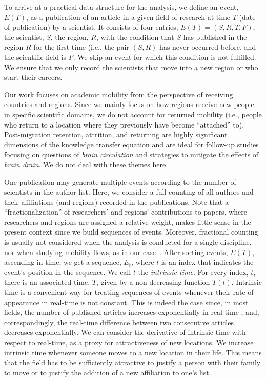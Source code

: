 \documentclass[draft,final]{vutinfth} %
\begin{document}
To arrive at a practical data structure for the analysis, we define an event, $E(T)$, as a publication of an article in a given field of research at time $T$ (date of publication) by a scientist. It consists of four entries,  $E(T)=(S, R, T, F)$, the scientist, $S$, the region, $R$, with the condition that $S$ has published in the region $R$ for the first time (i.e., the pair $(S,R)$ has never occurred before, and the scientific field is $F$. We skip an event for which this condition is not fulfilled. 
We ensure that we only record the scientists that move into a new region or who start their careers. 

Our work focuses on academic mobility from the perspective of receiving countries and regions. Since we mainly focus on how regions receive new people in specific scientific domains, we do not account for returned mobility (i.e., people who return to a location where they previously have become ``attached'' to).  Post-migration retention, attrition, and returning are highly significant dimensions of the knowledge transfer equation and are ideal for follow-up studies focusing on questions of \emph{brain circulation} and strategies to mitigate the effects of \emph{brain drain}. We do not deal with these themes here.

One publication may generate multiple events according to the number of scientists in the author list. 
%
Here, we consider a full counting of all authors and their affiliations (and regions) recorded in the publications.
Note that a ``fractionalization'' of researchers' and regions' contributions to papers, where researchers and regions are assigned a relative weight, makes little sense in the present context since we build sequences of events. Moreover, fractional counting is usually not considered when the analysis is conducted for a single discipline, nor when studying mobility flows, as in our case~\cite{garcia19,waltman15,moed05}.
%
After sorting events, $E(T)$, ascending in time, we get a sequence, $E_t$, where $t$ is an index that indicates the event's position in the sequence. We call $t$ the \emph{intrinsic time}. For every index, $t$, there is an associated time, $T$, given by a non-decreasing function $T(t)$. Intrinsic time is a convenient way for treating sequences of events whenever their rate of appearance in real-time is not constant. This is indeed the case since, in most fields, the number of published articles increases exponentially in real-time \cite{reisz22}, and, correspondingly, the real-time difference between two consecutive articles decreases exponentially. 
%
We can consider the derivative of intrinsic time with respect to real-time, as a proxy for attractiveness of new locations. 
We increase intrinsic time whenever someone moves to a new location in their life. This means that the field has to be sufficiently attractive to justify a person with their family to move or to justify the addition of a new affiliation to one's list.
\end{document}
